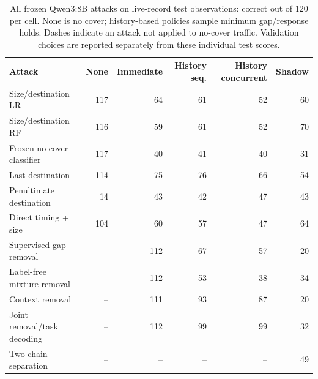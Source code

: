 \begin{table}[t]\centering\small
\caption{All frozen Qwen3:8B attacks on live-record test observations: correct out of 120 per cell. None is no cover; history-based policies sample minimum gap/response holds. Dashes indicate an attack not applied to no-cover traffic. Validation choices are reported separately from these individual test scores.}
\label{tab:live-attacks-qwen}
\setlength{\tabcolsep}{5pt}
\begin{tabularx}{\textwidth}{@{}Yrrrrr@{}}\toprule
Attack & None & Immediate & History seq. & History concurrent & Shadow\\\midrule
Size/destination LR & 117 & 64 & 61 & 52 & 60\\
Size/destination RF & 116 & 59 & 61 & 52 & 70\\
Frozen no-cover classifier & 117 & 40 & 41 & 40 & 31\\
Last destination & 114 & 75 & 76 & 66 & 54\\
Penultimate destination & 14 & 43 & 42 & 47 & 43\\
Direct timing + size & 104 & 60 & 57 & 47 & 64\\
Supervised gap removal & -- & 112 & 67 & 57 & 20\\
Label-free mixture removal & -- & 112 & 53 & 38 & 34\\
Context removal & -- & 111 & 93 & 87 & 20\\
Joint removal/task decoding & -- & 112 & 99 & 99 & 32\\
Two-chain separation & -- & -- & -- & -- & 49\\
\bottomrule\end{tabularx}
\end{table}
